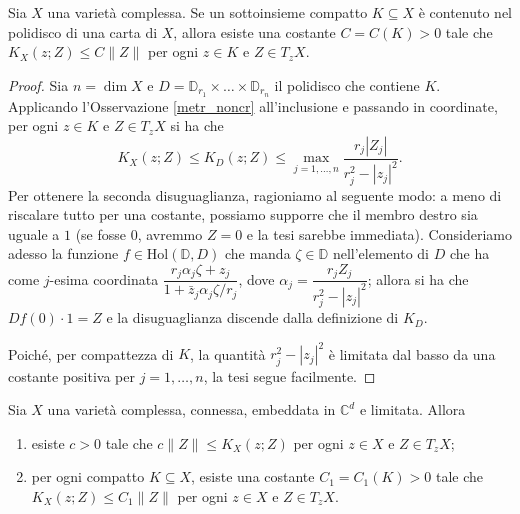 \begin{lm} \label{polycpt}
    Sia $X$ una varietà complessa. Se un sottoinsieme compatto $K\subseteq X$ è contenuto nel polidisco di una carta di $X$, allora esiste una costante $C=C(K)>0$ tale che $K_X(z;Z) \le C\|Z\|$ per ogni $z \in K$ e $Z \in T_zX$.
\end{lm}

\begin{proof}
    Sia $n=\dim{X}$ e $D=\mathbb{D}_{r_1}\times\dots\times\mathbb{D}_{r_n}$ il polidisco che contiene $K$. Applicando l'Osservazione \ref{metr_noncr} all'inclusione e passando in coordinate, per ogni $z \in K$ e $Z \in T_zX$ si ha che
    $$K_X(z;Z) \le K_D(z;Z) \le \max_{j=1,\dots,n} \frac{r_j|Z_j|}{r_j^2-|z_j|^2}.$$
    Per ottenere la seconda disuguaglianza, ragioniamo al seguente modo: a meno di riscalare tutto per una costante, possiamo supporre che il membro destro sia uguale a $1$ (se fosse $0$, avremmo $Z=0$ e la tesi sarebbe immediata). Consideriamo adesso la funzione $f\in\text{Hol}(\mathbb{D},D)$ che manda $\zeta\in\mathbb{D}$ nell'elemento di $D$ che ha come $j$-esima coordinata $\dfrac{r_j\alpha_j\zeta+z_j}{1+\bar{z}_j\alpha_j\zeta/r_j}$, dove $\alpha_j=\dfrac{r_jZ_j}{r_j^2-|z_j|^2}$; allora si ha che $Df(0)\cdot 1=Z$ e la disuguaglianza discende dalla definizione di $K_D$.
    
    Poiché, per compattezza di $K$, la quantità $r_j^2-|z_j|^2$ è limitata dal basso da una costante positiva per $j=1,\dots,n$, la tesi segue facilmente.
\end{proof}

\begin{prop} \label{metrica_bilip}
    Sia $X$ una varietà complessa, connessa, embeddata in $\mathbb{C}^d$ e limitata. Allora
    \begin{enumerate}[label={(\arabic*)}]
        \item esiste $c>0$ tale che $c\|Z\| \le K_X(z;Z)$ per ogni $z \in X$ e $Z \in T_zX$;
        \item per ogni compatto $K\subseteq X$, esiste una costante $C_1=C_1(K)>0$ tale che $K_X(z;Z) \le C_1\|Z\|$ per ogni $z \in X$ e $Z \in T_zX$.
    \end{enumerate}
\end{prop}

